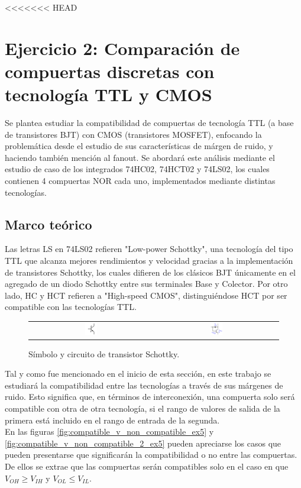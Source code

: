 <<<<<<< HEAD
\section{Ejercicio 2: Comparaci\'on de compuertas discretas con tecnolog\'ia TTL y CMOS}
Se plantea estudiar la compatibilidad de compuertas de tecnología TTL (a base de transistores BJT) con CMOS (transistores MOSFET), enfocando la problemática desde el 
estudio de sus características de márgen de ruido, y haciendo también mención al fanout. 
Se abordará este análisis mediante el estudio de caso de los integrados 74HC02, 74HCT02 y 74LS02, los cuales contienen 4 compuertas NOR cada uno, implementados mediante 
distintas tecnologías.



\subsection{Marco teórico}
Las letras LS en 74LS02 refieren "Low-power Schottky", una tecnología del tipo TTL que alcanza mejores rendimientos y velocidad gracias a la implementación de 
transistores Schottky, los cuales difieren de los clásicos BJT únicamente en el agregado de un diodo Schottky entre sus terminales Base y Colector.
Por otro lado, HC y HCT refieren a "High-speed CMOS", distinguiéndose HCT por ser compatible con las tecnologías TTL.

\begin{figure}[H]
    \centering
    \begin{tabular}{c c}
        \includegraphics[width=0.1\textwidth]{../EJ2/Recursos/schottky_transistor_symbol} &
        \includegraphics[width=0.1\textwidth]{../EJ2/Recursos/schottky_transistor_circuit}
    \end{tabular}
    \caption{Símbolo y circuito de transistor Schottky.}
    \label{fig:schottky_transistor_symbol_and_circuit_ex5}
\end{figure}

Tal y como fue mencionado en el inicio de esta sección, en este trabajo se estudiará la compatibilidad entre las tecnologías a través de sus márgenes de ruido.
Esto significa que, en términos de interconexión, una compuerta solo será compatible con otra de otra tecnología, si el rango de valores de salida de la primera está 
incluido en el rango de entrada de la segunda. \\
En las figuras \ref{fig:compatible_v_non_compatible_ex5} y \ref{fig:compatible_v_non_compatible_2_ex5} pueden apreciarse los casos que pueden presentarse que significarán la compatibilidad o no entre las compuertas.
De ellos se extrae que las compuertas serán compatibles solo en el caso en que $V_{OH} \geq V_{IH}$ y $V_{OL} \leq V_{IL}$.

